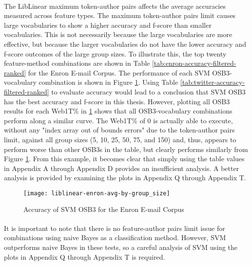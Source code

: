 	\paragraph*{} The LibLinear maximum token-author pairs affects the average accuracies measured across feature types. The maximum token-author pairs limit causes large vocabularies to show a higher accuracy and f-score than smaller vocabularies.  This is not necessarily because the large vocabularies are more effective, but because the larger vocabularies do not have the lower accuracy and f-score outcomes of the large group sizes.  To illustrate this, the top twenty feature-method combinations are shown in Table \ref{tab:enron-accuracy-filtered-ranked} for the Enron E-mail Corpus.  The performance of each SVM OSB3-vocabulary combination is shown in Figure \ref{fig:plot-liblinear-enron-accuracy}. Using Table \ref{tab:twitter-accuracy-filtered-ranked} to evaluate accuracy would lead to a conclusion that SVM OSB3 has the best accuracy and f-score in this thesis.  However, plotting all OSB3 results for each Web1T\%  in \ref{fig:plot-liblinear-enron-accuracy} shows that all OSB3-vocabulary combinations perform along a similar curve.  The Web1T\% of 0 is actually able to execute, without any "index array out of bounds errors" due to the token-author pairs limit, against all group sizes (5, 10, 25, 50, 75, and 150) and, thus, appears to perform worse than other OSB3s in the table, but clearly performs similarly from Figure \ref{fig:plot-liblinear-enron-accuracy}.  From this example, it becomes clear that simply using the table values in Appendix A through Appendix D provides an insufficient analysis.  A better analysis is provided by examining the plots in Appendix Q through Appendix T.  
	
\begin{figure}[htbp!]
	\centering
	\texttt{[image: liblinear-enron-avg-by-group\_size]}
	\caption{Accuracy of SVM OSB3 for the Enron E-mail Corpus}
	\label{fig:plot-liblinear-enron-accuracy}
\end{figure}
	
	\paragraph*{}It is important to note that there is no feature-author pairs limit issue for combinations using naive Bayes as a classification method.  However, SVM outperforms naive Bayes in these tests, so a careful analysis of SVM using the plots in Appendix Q through Appendix T is required.

